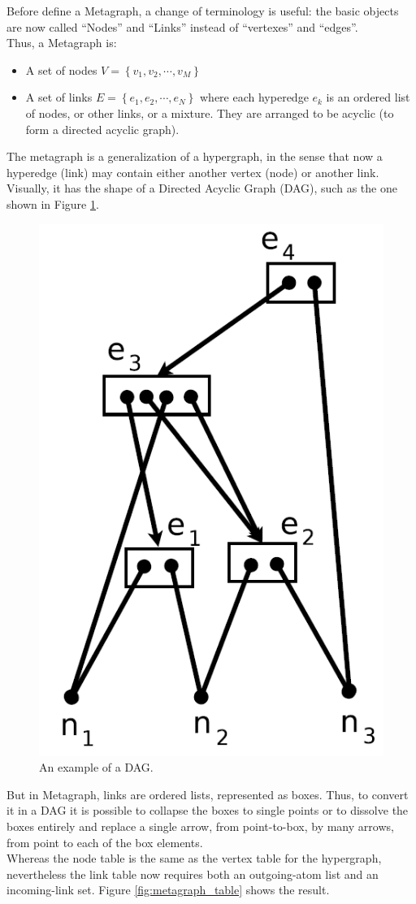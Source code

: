 Before define a Metagraph, a change of terminology is useful: the basic objects are now called \enquote{Nodes} and \enquote{Links} instead of \enquote{vertexes} and \enquote{edges}. \\
Thus, a Metagraph is:
\begin{itemize}
	\item A set of nodes $V=\left\{v_{1}, v_{2}, \cdots, v_{M}\right\}$
	\item A set of links $E=\left\{e_{1}, e_{2}, \cdots, e_{N}\right\}$ where each hyperedge $e_{k}$ is an ordered list of nodes, or other links, or a mixture. They are arranged to be acyclic (to form a directed acyclic graph).
\end{itemize}

The metagraph is a generalization of a hypergraph, in the sense that now a hyperedge (link) may contain either another vertex (node) or another link. Visually, it has the shape of a Directed Acyclic Graph (DAG), such as the one shown in Figure \ref{fig:metagraph_graph}.

\begin{figure} [h]
\centering
\includegraphics[width=0.4
\textwidth]{figures/Magistrale/metagraph_graph}
\caption[Directed Acyclic Graph ]{An example of a DAG.
\label{fig:metagraph_graph}}
\end{figure}

But in Metagraph, links are ordered lists, represented as boxes. Thus, to convert it in a DAG it is possible to collapse the boxes to single points or to dissolve the boxes entirely and replace a single arrow, from point-to-box, by many arrows, from point to each of the box elements.  \\
Whereas the node table is the same as the vertex table for the hypergraph, nevertheless the link table now requires both an outgoing-atom list and an incoming-link set.
Figure \ref{fig:metagraph_table} shows the result.

